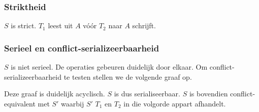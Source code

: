 \documentclass[transacties.tex]{subfiles}
\begin{document}
\subsubsection*{Striktheid}
$S$ is strict. $T_1$ leest uit $A$ v\'o\'or $T_2$ naar $A$ schrijft.

\subsubsection*{Serieel en conflict-serializeerbaarheid}
$S$ is niet serieel. De operaties gebeuren duidelijk door elkaar.
Om conflict-serializeerbaarheid te testen stellen we de volgende graaf op.
\begin{figure}[H]
\centering
{}
\end{figure}
\noindent Deze graaf is duidelijk acyclisch. $S$ is dus serialiseerbaar. $S$ is bovendien conflict-equivalent met $S'$ waarbij $S'$ $T_1$ en $T_2$ in die volgorde appart afhandelt.

\iffalse
\section{Timestamp ordering}
\subsection*{Opgave}

\subsection*{Antwoord}
\fi
\end{document}
